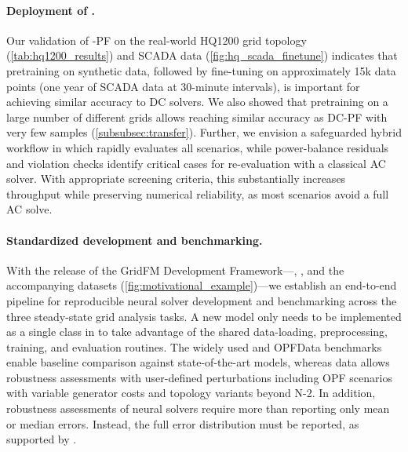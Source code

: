 \paragraph{Deployment of \genco.}
Our validation of \genco-PF on the real-world HQ1200 grid topology (\cref{tab:hq1200_results}) and SCADA data (\cref{fig:hq_scada_finetune}) indicates that pretraining \genco on synthetic \datakit data, followed by fine-tuning on approximately 15k data points (one year of SCADA data at 30-minute intervals), is important for achieving similar accuracy to DC solvers. We also showed that pretraining on a large number of different grids allows reaching similar accuracy as DC-PF with very few samples (\cref{subsubsec:transfer}). Further, we envision a safeguarded hybrid workflow in which \genco rapidly evaluates all scenarios, while power-balance residuals and violation checks identify critical cases for re-evaluation with a classical AC solver. With appropriate screening criteria, this substantially increases throughput while preserving numerical reliability, as most scenarios avoid a full AC solve.



\paragraph{Standardized development and benchmarking.}
With the release of the GridFM Development Framework---\datakit, \graphkit, and the accompanying datasets (\cref{fig:motivational_example})---we establish an end-to-end pipeline for reproducible neural solver development and benchmarking across the three steady-state grid analysis tasks. A new model only needs to be implemented as a single class in \graphkit to take advantage of the shared data-loading, preprocessing, training, and evaluation routines. The widely used \pfdelta and OPFData benchmarks enable baseline comparison against state-of-the-art models, whereas \datakit data allows robustness assessments with user-defined perturbations including OPF scenarios with variable generator costs and topology variants beyond N-2. In addition, robustness assessments of neural solvers require more than reporting only mean or median errors. Instead, the full error distribution must be reported, as supported by \graphkit. 

